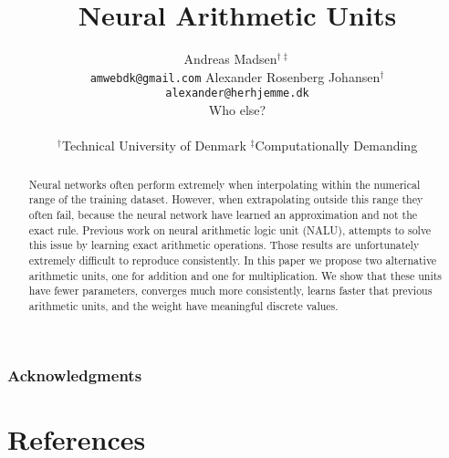 \documentclass{article}
\title{Neural Arithmetic Units}
\author{%
  Andreas Madsen$^{\dag\ddag}$ \\
  \texttt{amwebdk@gmail.com}
  \AND
  Alexander Rosenberg Johansen$^{\dag}$ \\
  \texttt{alexander@herhjemme.dk} \\
  \AND
  Who else? \\
  \\
$^\dag$Technical University of Denmark \quad
$^\ddag$Computationally Demanding
}
\begin{document}
\StopCensoring %

\maketitle

\begin{abstract}
Neural networks often perform extremely when interpolating within the numerical range of the training dataset. However, when extrapolating outside this range they often fail, because the neural network have learned an approximation and not the exact rule. Previous work on neural arithmetic logic unit (NALU), attempts to solve this issue by learning exact arithmetic operations. Those results are unfortunately extremely difficult to reproduce consistently. In this paper we propose two alternative arithmetic units, one for addition and one for multiplication. We show that these units have fewer parameters, converges much more consistently, learns faster that previous arithmetic units, and the weight have meaningful discrete values.
\end{abstract}





\subsubsection*{Acknowledgments}


\section*{References}


\end{document}
